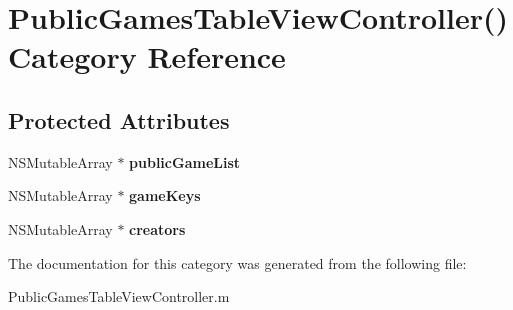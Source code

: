 \hypertarget{category_public_games_table_view_controller_07_08}{\section{Public\+Games\+Table\+View\+Controller() Category Reference}
\label{category_public_games_table_view_controller_07_08}
}
\subsection*{Protected Attributes}
\begin{DoxyCompactItemize}
\item 
\hypertarget{category_public_games_table_view_controller_07_08_aa5958c6036bca3e302b3fb8ab70ff5da}{N\+S\+Mutable\+Array $\ast$ {\bfseries public\+Game\+List}}\label{category_public_games_table_view_controller_07_08_aa5958c6036bca3e302b3fb8ab70ff5da}

\item 
\hypertarget{category_public_games_table_view_controller_07_08_a8eba01c509bf89f0eb62f6ffcd0142b1}{N\+S\+Mutable\+Array $\ast$ {\bfseries game\+Keys}}\label{category_public_games_table_view_controller_07_08_a8eba01c509bf89f0eb62f6ffcd0142b1}

\item 
\hypertarget{category_public_games_table_view_controller_07_08_a17120017fc049e4b8f237283ec02fe3a}{N\+S\+Mutable\+Array $\ast$ {\bfseries creators}}\label{category_public_games_table_view_controller_07_08_a17120017fc049e4b8f237283ec02fe3a}

\end{DoxyCompactItemize}


The documentation for this category was generated from the following file\+:\begin{DoxyCompactItemize}
\item 
Public\+Games\+Table\+View\+Controller.\+m\end{DoxyCompactItemize}
